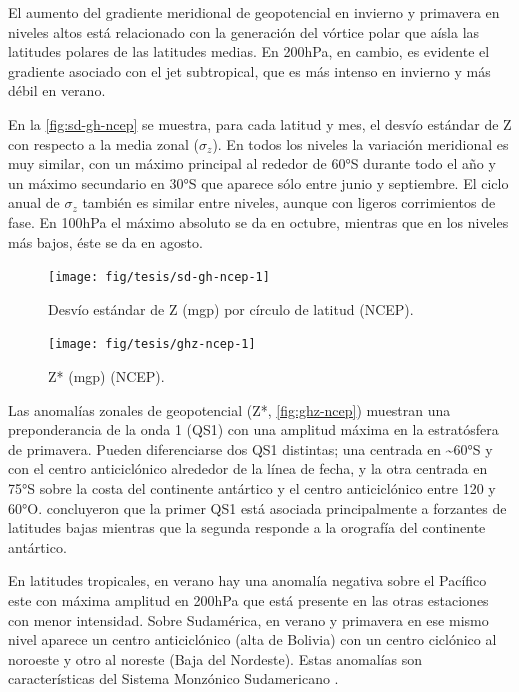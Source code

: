 \documentclass[spanish,a4paper,12pt,oneside]{book}
\begin{document}
El aumento del gradiente meridional de geopotencial en invierno y
primavera en niveles altos está relacionado con la generación del
vórtice polar que aísla las latitudes polares de las latitudes medias.
En 200hPa, en cambio, es evidente el gradiente asociado con el jet
subtropical, que es más intenso en invierno y más débil en verano.

En la \autoref{fig:sd-gh-ncep} se muestra, para cada latitud y mes, el
desvío estándar de Z con respecto a la media zonal (\(\sigma_z\)). En
todos los niveles la variación meridional es muy similar, con un máximo
principal al rededor de 60°S durante todo el año y un máximo secundario
en 30°S que aparece sólo entre junio y septiembre. El ciclo anual de
\(\sigma_z\) también es similar entre niveles, aunque con ligeros
corrimientos de fase. En 100hPa el máximo absoluto se da en octubre,
mientras que en los niveles más bajos, éste se da en agosto.

\begin{figure}
\texttt{[image: fig/tesis/sd-gh-ncep-1]} \caption{Desvío estándar de Z (mgp) por círculo de latitud (NCEP).}\label{fig:sd-gh-ncep}
\end{figure}

\begin{landscape}\begin{figure}

{\centering \texttt{[image: fig/tesis/ghz-ncep-1]} 

}

\caption{Z* (mgp) (NCEP).}\label{fig:ghz-ncep}
\end{figure}
\end{landscape}

Las anomalías zonales de geopotencial (Z*, \autoref{fig:ghz-ncep})
muestran una preponderancia de la onda 1 (QS1) con una amplitud máxima
en la estratósfera de primavera. Pueden diferenciarse dos QS1 distintas;
una centrada en \textasciitilde{}60°S y con el centro anticiclónico
alrededor de la línea de fecha, y la otra centrada en 75°S sobre la
costa del continente antártico y el centro anticiclónico entre 120 y
60°O. \citet{Quintanar1995} concluyeron que la primer QS1 está asociada
principalmente a forzantes de latitudes bajas mientras que la segunda
responde a la orografía del continente antártico.

En latitudes tropicales, en verano hay una anomalía negativa sobre el
Pacífico este con máxima amplitud en 200hPa que está presente en las
otras estaciones con menor intensidad. Sobre Sudamérica, en verano y
primavera en ese mismo nivel aparece un centro anticiclónico (alta de
Bolivia) con un centro ciclónico al noroeste y otro al noreste (Baja del
Nordeste). Estas anomalías son características del Sistema Monzónico
Sudamericano \citep{Vera2006}.
\end{document}
